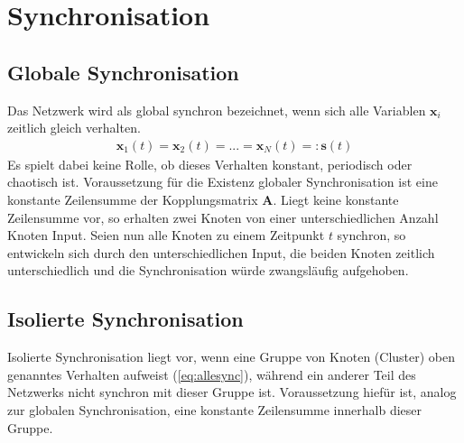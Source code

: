 \section{Synchronisation}
\subsection*{Globale Synchronisation}
Das Netzwerk wird als global synchron bezeichnet, wenn sich alle Variablen $\boldsymbol{x}_i$ zeitlich gleich verhalten.
\begin{align}\label{eq:allesync}
\boldsymbol{x}_1(t)=\boldsymbol{x}_2(t)=...=\boldsymbol{x}_N(t)=:\boldsymbol{s}(t)
\end{align}
Es spielt dabei keine Rolle, ob dieses Verhalten konstant, periodisch oder chaotisch ist.
Voraussetzung für die Existenz globaler Synchronisation ist eine konstante Zeilensumme der Kopplungsmatrix $\boldsymbol{A}$. Liegt keine konstante Zeilensumme vor, so erhalten zwei Knoten von einer unterschiedlichen Anzahl Knoten Input. Seien nun alle Knoten zu einem Zeitpunkt $t$ synchron, so entwickeln sich durch den unterschiedlichen Input, die beiden Knoten zeitlich unterschiedlich und die Synchronisation würde zwangsläufig aufgehoben.
\subsection*{Isolierte Synchronisation}
Isolierte Synchronisation liegt vor, wenn eine Gruppe von Knoten (Cluster) oben genanntes Verhalten aufweist (\ref{eq:allesync}), während ein anderer Teil des Netzwerks nicht synchron mit dieser Gruppe ist. Voraussetzung hiefür ist, analog zur globalen Synchronisation, eine konstante Zeilensumme innerhalb dieser Gruppe.

